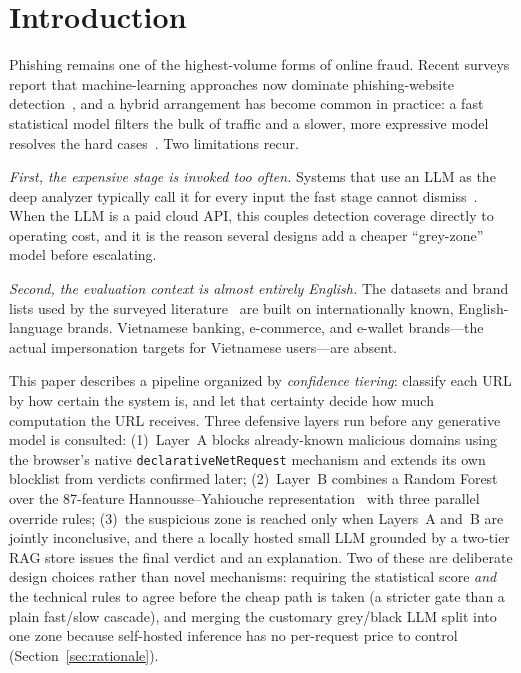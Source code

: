 \documentclass[conference]{IEEEtran}
\begin{document}
\section{Introduction}
Phishing remains one of the highest-volume forms of online fraud. Recent surveys
report that machine-learning approaches now dominate phishing-website
detection~\cite{safi2023slr,divakaran2022review}, and a hybrid arrangement has
become common in practice: a fast statistical model filters the bulk of traffic
and a slower, more expressive model resolves the hard
cases~\cite{koide2024chatphishdetector,divakaran2022review}. Two limitations
recur.

\emph{First, the expensive stage is invoked too often.} Systems that use an LLM
as the deep analyzer typically call it for every input the fast stage cannot
dismiss~\cite{koide2024chatphishdetector,lee2024multimodal}. When the LLM is a
paid cloud API, this couples detection coverage directly to operating cost, and
it is the reason several designs add a cheaper ``grey-zone'' model before
escalating.

\emph{Second, the evaluation context is almost entirely English.} The datasets
and brand lists used by the surveyed literature~\cite{koide2024chatphishdetector,
lee2024multimodal,hannousse2021benchmark,tamal2024ofva} are built on
internationally known, English-language brands. Vietnamese banking, e-commerce,
and e-wallet brands---the actual impersonation targets for Vietnamese users---are
absent.

This paper describes a pipeline organized by \emph{confidence tiering}: classify
each URL by how certain the system is, and let that certainty decide how much
computation the URL receives. Three defensive layers run before any generative
model is consulted: (1)~Layer~A blocks already-known malicious domains using the
browser's native \texttt{declarativeNetRequest} mechanism and extends its own
blocklist from verdicts confirmed later; (2)~Layer~B combines a Random Forest
over the 87-feature Hannousse--Yahiouche
representation~\cite{hannousse2021benchmark,hannousse2021dataset} with three
parallel override rules; (3)~the suspicious zone is reached only when Layers~A
and~B are jointly inconclusive, and there a locally hosted small LLM grounded by a
two-tier RAG store issues the final verdict and an explanation. Two of these are
deliberate design choices rather than novel mechanisms: requiring the statistical
score \emph{and} the technical rules to agree before the cheap path is taken (a
stricter gate than a plain fast/slow cascade), and merging the customary
grey/black LLM split into one zone because self-hosted inference has no
per-request price to control (Section~\ref{sec:rationale}).
\end{document}
